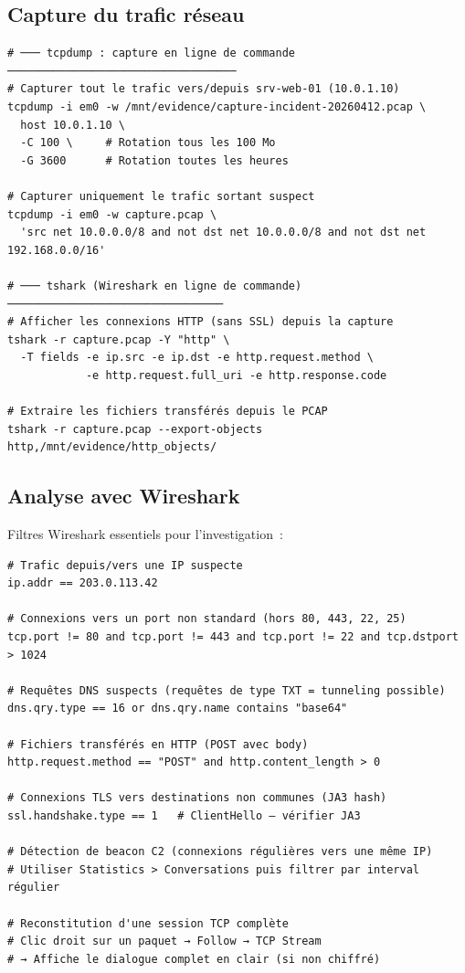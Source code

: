 \subsection{Capture du trafic réseau}

\begin{lstlisting}[style=StyleTerminal,
  caption={Capture réseau avec tcpdump et Wireshark},
  label={lst:capture-reseau}]
# ─── tcpdump : capture en ligne de commande ───────────────────────────────────
# Capturer tout le trafic vers/depuis srv-web-01 (10.0.1.10)
tcpdump -i em0 -w /mnt/evidence/capture-incident-20260412.pcap \
  host 10.0.1.10 \
  -C 100 \     # Rotation tous les 100 Mo
  -G 3600      # Rotation toutes les heures

# Capturer uniquement le trafic sortant suspect
tcpdump -i em0 -w capture.pcap \
  'src net 10.0.0.0/8 and not dst net 10.0.0.0/8 and not dst net 192.168.0.0/16'

# ─── tshark (Wireshark en ligne de commande) ─────────────────────────────────
# Afficher les connexions HTTP (sans SSL) depuis la capture
tshark -r capture.pcap -Y "http" \
  -T fields -e ip.src -e ip.dst -e http.request.method \
            -e http.request.full_uri -e http.response.code

# Extraire les fichiers transférés depuis le PCAP
tshark -r capture.pcap --export-objects http,/mnt/evidence/http_objects/
\end{lstlisting}

\subsection{Analyse avec Wireshark}

Filtres Wireshark essentiels pour l'investigation~:

\begin{lstlisting}[style=StyleCode,
  caption={Filtres Wireshark pour l'investigation forensique},
  label={lst:wireshark-filtres}]
# Trafic depuis/vers une IP suspecte
ip.addr == 203.0.113.42

# Connexions vers un port non standard (hors 80, 443, 22, 25)
tcp.port != 80 and tcp.port != 443 and tcp.port != 22 and tcp.dstport > 1024

# Requêtes DNS suspects (requêtes de type TXT = tunneling possible)
dns.qry.type == 16 or dns.qry.name contains "base64"

# Fichiers transférés en HTTP (POST avec body)
http.request.method == "POST" and http.content_length > 0

# Connexions TLS vers destinations non communes (JA3 hash)
ssl.handshake.type == 1   # ClientHello — vérifier JA3

# Détection de beacon C2 (connexions régulières vers une même IP)
# Utiliser Statistics > Conversations puis filtrer par interval régulier

# Reconstitution d'une session TCP complète
# Clic droit sur un paquet → Follow → TCP Stream
# → Affiche le dialogue complet en clair (si non chiffré)
\end{lstlisting}

